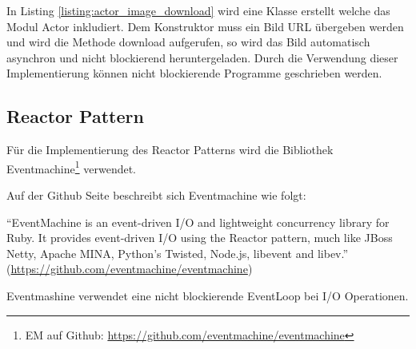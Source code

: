 In Listing \ref{listing:actor_image_download} wird eine Klasse erstellt welche das Modul Actor inkludiert. Dem Konstruktor muss ein Bild URL übergeben werden und wird die Methode download aufgerufen, so wird das Bild automatisch asynchron und nicht blockierend heruntergeladen. Durch die Verwendung dieser Implementierung können nicht blockierende Programme geschrieben werden. 

\subsection{Reactor Pattern}
Für die Implementierung des Reactor Patterns wird die Bibliothek Eventmachine\footnote{EM auf Github: \url{https://github.com/eventmachine/eventmachine}} verwendet. 

Auf der Github Seite beschreibt sich Eventmachine wie folgt: 

	``EventMachine is an event-driven I/O and lightweight concurrency library for Ruby. It provides event-driven I/O using the Reactor pattern, much like JBoss Netty, Apache MINA, Python's Twisted, Node.js, libevent and libev.'' (\url{https://github.com/eventmachine/eventmachine})

Eventmashine verwendet eine nicht blockierende EventLoop bei I/O Operationen. 